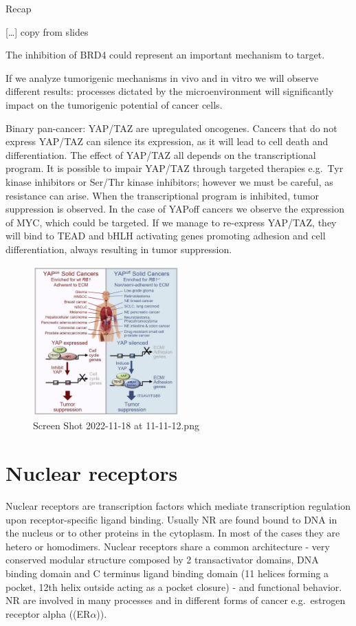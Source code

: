 Recap

{[}\ldots{]} copy from slides

The inhibition of BRD4 could represent an important mechanism to target.

If we analyze tumorigenic mechanisms in vivo and in vitro we will observe different results: processes dictated by the microenvironment will significantly impact on the tumorigenic potential of cancer cells.

Binary pan-cancer: YAP/TAZ are upregulated oncogenes. Cancers that do not express YAP/TAZ can silence its expression, as it will lead to cell death and differentiation. The effect of YAP/TAZ all depends on the transcriptional program. It is possible to impair YAP/TAZ through targeted therapies e.g.~Tyr kinase inhibitors or Ser/Thr kinase inhibitors; however we must be careful, as resistance can arise. When the transcriptional program is inhibited, tumor suppression is observed. In the case of YAPoff cancers we observe the expression of MYC, which could be targeted. If we manage to re-express YAP/TAZ, they will bind to TEAD and bHLH activating genes promoting adhesion and cell differentiation, always resulting in tumor suppression.

\begin{figure}
\centering
\includegraphics[width=0.5\textwidth]{../_resources/Screen_Shot_2022-11-18_at_11-11-12.png}
\caption{Screen Shot 2022-11-18 at 11-11-12.png}
\end{figure}

\hypertarget{nuclear-receptors}{%
\section{Nuclear receptors}\label{nuclear-receptors}}

Nuclear receptors are transcription factors which mediate transcription regulation upon receptor-specific ligand binding. Usually NR are found bound to DNA in the nucleus or to other proteins in the cytoplasm. In most of the cases they are hetero or homodimers. Nuclear receptors share a common architecture - very conserved modular structure composed by 2 transactivator domains, DNA binding domain and C terminus ligand binding domain (11 helices forming a pocket, 12th helix outside acting as a pocket closure) - and functional behavior. NR are involved in many processes and in different forms of cancer e.g.~estrogen receptor alpha ((ER$\alpha$)).

